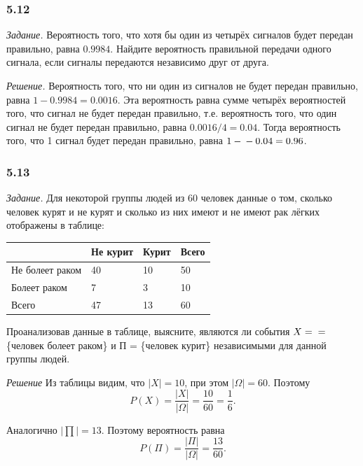 \subsubsection*{5.12}

\textit{Задание.} Вероятность того, что хотя бы один из четырёх сигналов будет передан правильно, равна $0.9984$.
Найдите вероятность правильной передачи одного сигнала, если сигналы передаются независимо друг от друга.

\textit{Решение.} Вероятность того, что ни один из сигналов не будет передан правильно, равна $1 - 0.9984 = 0.0016$.
Эта вероятность равна сумме четырёх вероятностей того, что сигнал не будет передан правильно, т.е. вероятность того,
что один сигнал не будет передан правильно, равна $0.0016/4 = 0.04$.
Тогда вероятность того, что 1 сигнал будет передан правильно, равна $1 - \\ - 0.04 = 0.96$.

\subsubsection*{5.13}

\textit{Задание.} Для некоторой группы людей из 60 человек данные о том, сколько человек курят и не курят и сколько из них имеют и не имеют рак лёгких отображены в таблице:
\begin{center}
\begin{tabular}{|l|l|l|l|}
\hline
& Не курит & Курит & Всего \\ \hline
Не болеет раком & 40 & 10 & 50 \\ \hline
Болеет раком & 7 & 3 & 10 \\ \hline
Всего & 47 & 13 & 60 \\
\hline
\end{tabular}
\end{center}
Проанализовав данные в таблице,
выясните, являются ли события $X = \\ =$ \{человек болеет раком\} и П = \{человек курит\} независимыми для данной группы людей.

\textit{Решение} Из таблицы видим, что $ \left| X \right| = 10$, при этом $\left| \Omega \right| = 60$.
Поэтому
$$P \left( X \right) =
\frac{ \left| X \right| }{ \left| \Omega \right| } =
\frac{10}{60} =
\frac{1}{6}.$$

Аналогично $ \left| \prod \right| = 13$.
Поэтому вероятность равна
$$P \left( \Pi \right) =
\frac{ \left| \Pi \right| }{ \left| \Omega \right| } =
\frac{13}{60}.$$

